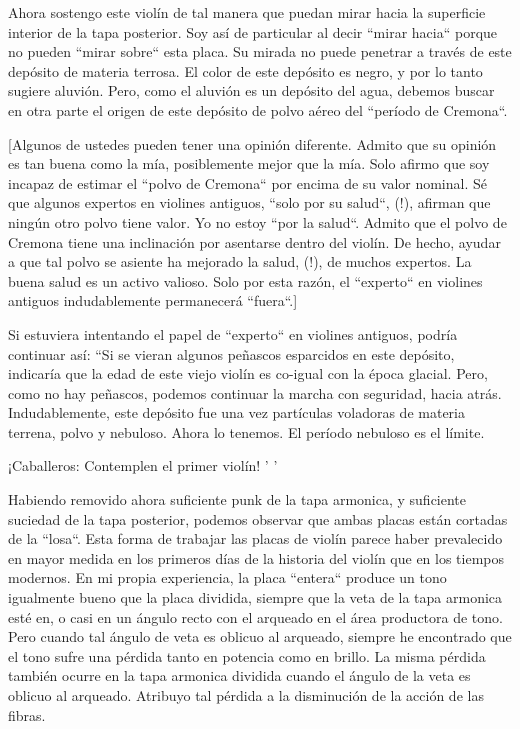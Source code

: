 \documentclass[12pt]{book}
\begin{document}
Ahora sostengo este violín de tal manera que puedan mirar hacia la superficie interior de la tapa posterior. Soy así de particular al decir ``mirar hacia`` porque no pueden ``mirar sobre`` esta placa. Su mirada no puede penetrar a través de este depósito de materia terrosa. El color de este depósito es negro, y por lo tanto sugiere aluvión. Pero, como el aluvión es un depósito del agua, debemos buscar en otra parte el origen de este depósito de polvo aéreo del ``período de Cremona``.

[Algunos de ustedes pueden tener una opinión diferente. Admito que su opinión es tan buena como la mía, posiblemente mejor que la mía. Solo afirmo que soy incapaz de estimar el ``polvo de Cremona`` por encima de su valor nominal. Sé que algunos expertos en violines antiguos, ``solo por su salud``, (!), afirman que ningún otro polvo tiene valor. Yo no estoy ``por la salud``. Admito que el polvo de Cremona tiene una inclinación por asentarse dentro del violín. De hecho, ayudar a que tal polvo se asiente ha mejorado la salud, (!), de muchos expertos. La buena salud es un activo valioso. Solo por esta razón, el ``experto`` en violines antiguos indudablemente permanecerá ``fuera``.]

Si estuviera intentando el papel de ``experto`` en violines antiguos, podría continuar así: ``Si se vieran algunos peñascos esparcidos en este depósito, indicaría que la edad de este viejo violín es co-igual con la época glacial. Pero, como no hay peñascos, podemos continuar la marcha con seguridad, hacia atrás. Indudablemente, este depósito fue una vez partículas voladoras de materia terrena, polvo y nebuloso. Ahora lo tenemos. El período nebuloso es el límite.

¡Caballeros: Contemplen el primer violín! ' '

Habiendo removido ahora suficiente punk de la tapa armonica, y suficiente suciedad de la tapa posterior, podemos observar que ambas placas están cortadas de la ``losa``. Esta forma de trabajar las placas de violín parece haber prevalecido en mayor medida en los primeros días de la historia del violín que en los tiempos modernos. En mi propia experiencia, la placa ``entera`` produce un tono igualmente bueno que la placa dividida, siempre que la veta de la tapa armonica esté en, o casi en un ángulo recto con el arqueado en el área productora de tono. Pero cuando tal ángulo de veta es oblicuo al arqueado, siempre he encontrado que el tono sufre una pérdida tanto en potencia como en brillo. La misma pérdida también ocurre en la tapa armonica dividida cuando el ángulo de la veta es oblicuo al arqueado. Atribuyo tal pérdida a la disminución de la acción de las fibras.
\end{document}
